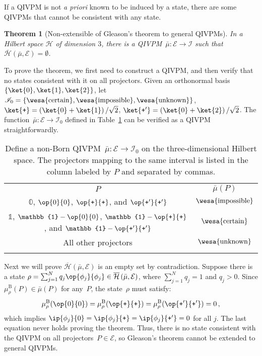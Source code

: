\documentclass[english,reprint, aps, prl,superscriptaddress, showpacs,
showkeys, longbibliography, amsmath, amssymb, floatfix]{revtex4-1}
\theoremstyle{plain}
\newtheorem{thm}{Theorem}
\theoremstyle{definition}
\newcommand{\Hilb}{\mathcal{H}}
\newcommand{\events}{\ensuremath{\mathcal{E}}}
\newcommand{\imposs}{{\text{\wesa{impossible}}}}
\newcommand{\necess}{{\text{\wesa{certain}}}}
\newcommand{\unknown}{{\text{\wesa{unknown}}}}
\newcommand{\proj}[1]{\op{#1}{#1}}
\newcommand{\ps}{\texttt{+}}
\newcommand{\coreBorn}{\ensuremath{\overline{\Hilb}}}
\begin{document}
If a QIVPM is not \emph{a priori} known to be induced by a state,
there are some QIVPMs that cannot be consistent with any state.

\begin{thm}[Non-extensible of Gleason's theorem to general QIVPMs]\label{thm:Non-extensible-of-Gleason's}In
a Hilbert space $\Hilb$ of dimension $3$, there is a QIVPM~$\bar{\mu}:\events\rightarrow\mathscr{I}$
such that $\coreBorn\left(\bar{\mu},\events\right)=\emptyset$.\end{thm}

\noindent To prove the theorem, we first need to construct a QIVPM,
and then verify that no states consistent with it on all projectors.
Given an orthonormal basis $\left\{ \ket{0},\ket{1},\ket{2}\right\} $,
let $\mathscr{I}_{0}=\left\{ \necess,\imposs,\unknown\right\} $,
$\ket{\ps}=\left(\ket{0}+\ket{1}\right)/\sqrt{2}$, $\ket{\ps'}=\left(\ket{0}+\ket{2}\right)/\sqrt{2}$.
The function~$\bar{\mu}:\events\rightarrow\mathscr{I}_{0}$ defined
in Table~\ref{tab:non-Born-QIVPM} can be verified as a QIVPM straightforwardly.
\begin{table}
\caption{\label{tab:non-Born-QIVPM}Define a non-Born QIVPM~$\bar{\mu}:\events\rightarrow\mathscr{I}_{0}$
on the three-dimensional Hilbert space. The projectors mapping to
the same interval is listed in the column labeled by $P$ and separated
by commas.}

\begin{tabular}{cc}
\toprule 
\addlinespace
$P$ & $\bar{\mu}\left(P\right)$\tabularnewline\addlinespace
\midrule
\midrule 
\addlinespace
$\mathbb{0}$, $\proj{0}$, $\proj{\ps}$, and $\proj{\ps'}$ & $\imposs$\tabularnewline\addlinespace
\midrule 
\addlinespace
$\mathbb{1}$, $\mathbb{1}-\proj{0}$, $\mathbb{1}-\proj{\ps}$, and
$\mathbb{1}-\proj{\ps'}$ & $\necess$\tabularnewline\addlinespace
\midrule 
\addlinespace
All other projectors & $\unknown$\tabularnewline\addlinespace
\bottomrule
\end{tabular}
\end{table}
Next we will prove $\coreBorn\left(\bar{\mu},\events\right)$ is an
empty set by contradiction. Suppose there is a state $\rho=\sum_{j=1}^{N}q_{j}\proj{\phi_{j}}\in\coreBorn\left(\bar{\mu},\events\right)$,
where $\sum_{j=1}^{N}q_{j}=1$ and $q_{j}>0$. Since $\mu_{\rho}^{\mathrm{B}}(P)\in\bar{\mu}(P)$
for any~$P$, the state~$\rho$ must satisfy: 
\begin{equation}
\mu_{\rho}^{\mathrm{B}}(\proj{0})=\mu_{\rho}^{\mathrm{B}}(\proj{\ps})=\mu_{\rho}^{\mathrm{B}}(\proj{\ps'})=0\,,
\end{equation}
which implies $\ip{\phi_{j}}{0}=\ip{\phi_{j}}{\ps}=\ip{\phi_{j}}{\ps'}=0$
for all $j$. The last equation never holds proving the theorem. Thus,
there is no state consistent with the QIVPM on all projectors~$P\in\events$,
so Gleason's theorem cannot be extended to general QIVPMs.
\end{document}
